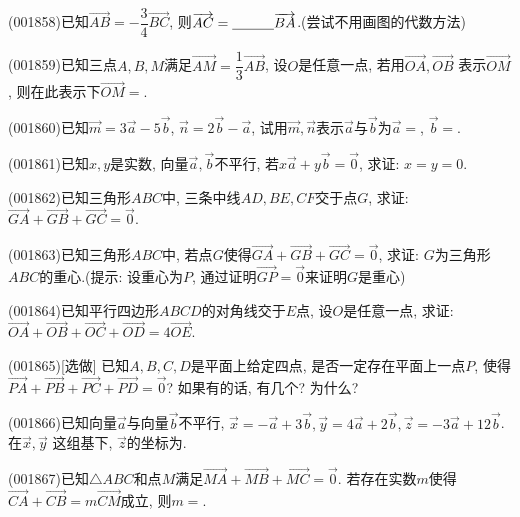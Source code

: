 \item (001858)已知$\overrightarrow{AB}=-\dfrac{3}{4}\overrightarrow{BC}$, 则$\overrightarrow{AC}=\blank{30}\overrightarrow{BA}$.(尝试不用画图的代数方法)
\item (001859)已知三点$A,B,M$满足$\overrightarrow{AM}=\dfrac{1}{3}\overrightarrow{AB}$, 设$O$是任意一点, 若用$\overrightarrow{OA},\overrightarrow{OB}$
表示$\overrightarrow{OM}$, 则在此表示下$\overrightarrow{OM}=$.
\item (001860)已知$\overrightarrow{m}=3\overrightarrow{a}-5\overrightarrow{b}$, $\overrightarrow{n}=2\overrightarrow{b}-\overrightarrow{a}$, 试用$\overrightarrow{m},\overrightarrow{n}$表示$\overrightarrow{a}$与$\overrightarrow{b}$为$\overrightarrow{a}=$, $\overrightarrow{b}=$.
\item (001861)已知$x,y$是实数, 向量$\overrightarrow{a},\overrightarrow{b}$不平行, 若$x\overrightarrow{a}+y\overrightarrow{b}=\overrightarrow{0}$, 求证: $x=y=0$.
\item (001862)已知三角形$ABC$中, 三条中线$AD,BE,CF$交于点$G$, 求证: $\overrightarrow{GA}+\overrightarrow{GB}+\overrightarrow{GC}=\overrightarrow{0}$.
\item (001863)已知三角形$ABC$中, 若点$G$使得$\overrightarrow{GA}+\overrightarrow{GB}+\overrightarrow{GC}=\overrightarrow{0}$, 求证: $G$为三角形$ABC$的重心.(提示: 设重心为$P$, 通过证明$\overrightarrow{GP}=\overrightarrow{0}$来证明$G$是重心)
\item (001864)已知平行四边形$ABCD$的对角线交于$E$点, 设$O$是任意一点, 求证: $\overrightarrow{OA}+\overrightarrow{OB}+\overrightarrow{OC}+\overrightarrow{OD}=4\overrightarrow{OE}$.
\item (001865)[选做]
已知$A,B,C,D$是平面上给定四点, 是否一定存在平面上一点$P$, 使得$\overrightarrow{PA}+\overrightarrow{PB}+\overrightarrow{PC}+\overrightarrow{PD}=\overrightarrow{0}$? 如果有的话, 有几个? 为什么?
\item (001866)已知向量$\overrightarrow{a}$与向量$\overrightarrow{b}$不平行, $\overrightarrow{x}=-\overrightarrow{a}+3\overrightarrow{b},\overrightarrow{y}=4\overrightarrow{a}+2\overrightarrow{b},\overrightarrow{z}=-3\overrightarrow{a}+12\overrightarrow{b}$. 在$\overrightarrow{x},\overrightarrow{y}$ 这组基下, $\overrightarrow{z}$的坐标为.
\item (001867)已知$\triangle ABC$和点$M$满足$\overrightarrow{MA}+\overrightarrow{MB}+\overrightarrow{MC}=\overrightarrow{0}$. 若存在实数$m$使得$\overrightarrow{CA}+\overrightarrow{CB}=m\overrightarrow{CM}$成立, 则$m=$.
